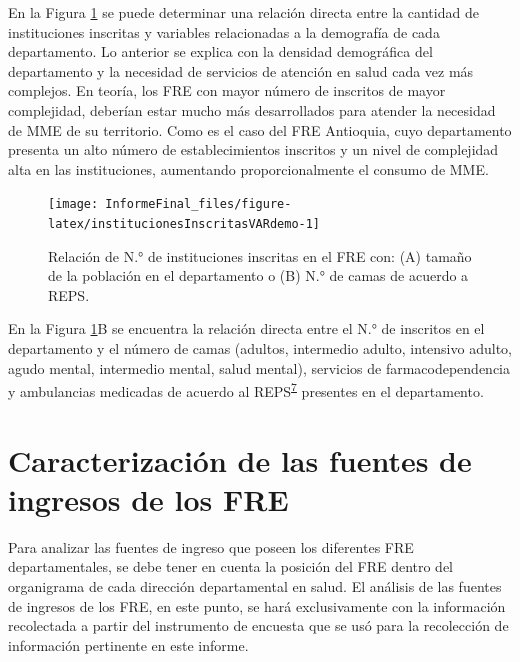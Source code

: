 \documentclass[
]{book}
\begin{document}
En la Figura \ref{fig:institucionesInscritasVARdemo} se puede determinar una relación directa entre la cantidad de instituciones inscritas y variables relacionadas a la demografía de cada departamento. Lo anterior se explica con la densidad demográfica del departamento y la necesidad de servicios de atención en salud cada vez más complejos. En teoría, los FRE con mayor número de inscritos de mayor complejidad, deberían estar mucho más desarrollados para atender la necesidad de MME de su territorio. Como es el caso del FRE Antioquia, cuyo departamento presenta un alto número de establecimientos inscritos y un nivel de complejidad alta en las instituciones, aumentando proporcionalmente el consumo de MME.

\begin{figure}[b!]

{\centering \texttt{[image: InformeFinal\_files/figure-latex/institucionesInscritasVARdemo-1]} 

}

\caption{Relación de N.° de instituciones inscritas en el FRE con: (A) tamaño de la población en el departamento o (B) N.° de camas de acuerdo a REPS.}\label{fig:institucionesInscritasVARdemo}
\end{figure}

En la Figura \ref{fig:institucionesInscritasVARdemo}B se encuentra la relación directa entre el N.° de inscritos en el departamento y el número de camas (adultos, intermedio adulto, intensivo adulto, agudo mental, intermedio mental, salud mental), servicios de farmacodependencia y ambulancias medicadas de acuerdo al REPS\textsuperscript{\protect\hyperlink{ref-DireccionPrestaciondeServiciosyAtencionPrimaria2021}{7}} presentes en el departamento.

\hypertarget{caracterizaciuxf3n-de-las-fuentes-de-ingresos-de-los-fre}{%
\section{Caracterización de las fuentes de ingresos de los FRE}\label{caracterizaciuxf3n-de-las-fuentes-de-ingresos-de-los-fre}}

Para analizar las fuentes de ingreso que poseen los diferentes FRE departamentales, se debe tener en cuenta la posición del FRE dentro del organigrama de cada dirección departamental en salud. El análisis de las fuentes de ingresos de los FRE, en este punto, se hará exclusivamente con la información recolectada a partir del instrumento de encuesta que se usó para la recolección de información pertinente en este informe.
\end{document}
